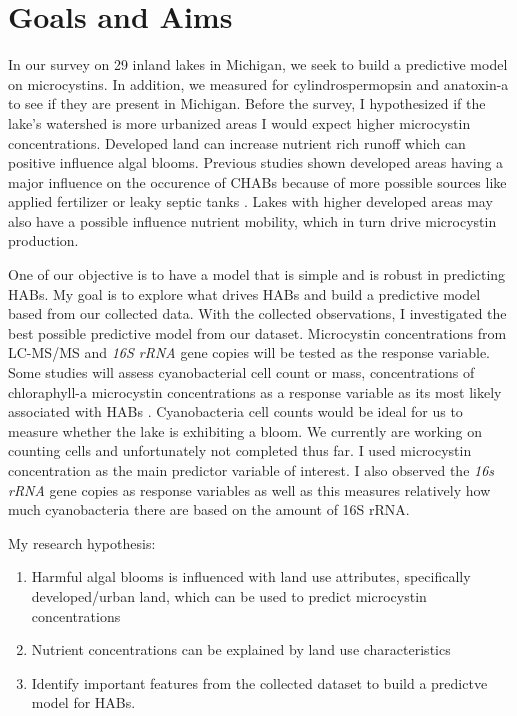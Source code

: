 \section{Goals and Aims}

In our survey on 29 inland lakes in Michigan, we seek to build a predictive model on microcystins. In addition, we  measured for cylindrospermopsin and anatoxin-a to see if they are present in Michigan. Before the survey, I hypothesized if the lake's watershed is more urbanized areas I would expect higher microcystin concentrations. Developed land can increase nutrient rich runoff which can positive influence algal blooms. Previous studies shown developed areas having a major influence on the occurence of CHABs because of more possible sources like applied fertilizer or leaky septic tanks \cite{beaver_land_2014, anderson_harmful_2002}. Lakes with higher developed areas may also have a possible influence nutrient mobility, which in turn drive microcystin production.

One of our objective is to have a model that is simple and is robust in predicting HABs.
My goal is to explore what drives HABs and build a predictive model based from our collected data.  With the collected observations, I investigated the best possible predictive model from our dataset. Microcystin concentrations from LC-MS/MS and \emph{16S rRNA} gene copies will be tested as the response variable.
Some studies will assess cyanobacterial cell count or mass, concentrations of chloraphyll-a microcystin concentrations as a response variable as its most likely associated with HABs \cite{moore_richard_cyanobacterial_1993, ahn_evaluation_2011, jiang_statistical_2008, beaulieu_nutrients_2013, taranu_predicting_2017}. Cyanobacteria cell counts would be ideal for us to measure whether the lake is exhibiting a bloom. We currently are working on counting cells and unfortunately not completed thus far.  I used microcystin concentration as the main predictor variable of interest. I also observed the \emph{16s rRNA} gene copies as response variables as well as this measures relatively how much cyanobacteria there are based on the amount of 16S rRNA.

My research hypothesis:

\begin{enumerate}
\item Harmful algal blooms is influenced with land use attributes, specifically developed/urban land, which can be used to predict microcystin concentrations
\item Nutrient concentrations can be explained by land use characteristics
\item Identify important features from the collected dataset to build a predictve model for HABs.
\end{enumerate}
